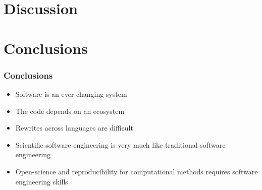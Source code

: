 \documentclass{beamer}
\begin{document}
\section{Discussion}

\section{Conclusions}

\begin{frame}
\frametitle{Conclusions}
\begin{itemize}
	\item Software is an ever-changing system
	\item The code depends on an ecosystem
	\item Rewrites across languages are difficult
	\item Scientific software engineering is very much like traditional software engineering
	\item Open-science and reproducibility for computational methods requires software engineering skills
\end{itemize}
\end{frame}
\end{document}
